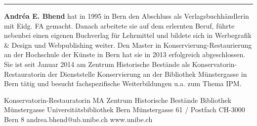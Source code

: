 \begin{center}\rule{0.5\linewidth}{0.5pt}\end{center}

\textbf{Andréa E. Bhend} hat in 1995 in Bern den Abschluss als
Verlagsbuchhändlerin mit Eidg. FA gemacht. Danach arbeitete sie auf dem
erlernten Beruf, führte nebenbei einen eigenen Buchverlag für Lehrmittel
und bildete sich in Werbegrafik \& Design und Webpublishing weiter. Den
Master in Konservierung-Restaurierung an der Hochschule der Künste in
Bern hat sie in 2013 erfolgreich abgeschlossen. Sie ist seit Januar 2014
am Zentrum Historische Bestände als Konservatorin-Restauratorin der
Dienststelle Konservierung an der Bibliothek Münstergasse in Bern tätig
und besucht fachspezifische Weiterbildungen u.a. zum Thema IPM.

Konservatorin-Restauratorin MA
Zentrum Historische Bestände 
Bibliothek Münstergasse
Universitätsbibliothek Bern
Münstergasse 61 / Postfach
CH-3000 Bern 8
andrea.bhend@ub.unibe.ch
www.unibe.ch
